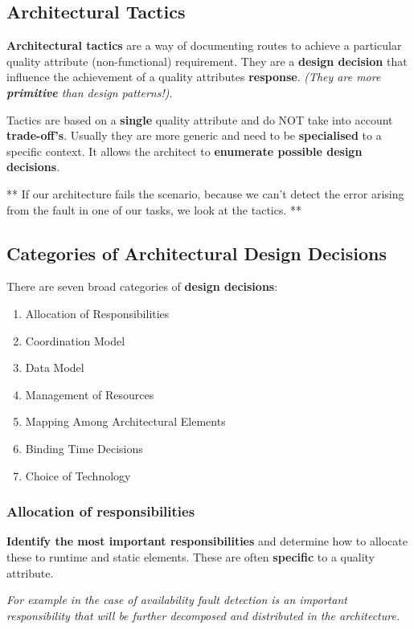 \documentclass[a4paper]{article}
\begin{document}
\subsection{Architectural Tactics}
\textbf{Architectural tactics} are a way of documenting routes to achieve a particular quality attribute (non-functional) requirement. They are a \textbf{design decision} that influence the achievement of a quality attributes \textbf{response}. \textit{(They are more \textbf{primitive} than design patterns!)}.

Tactics are based on a \textbf{single} quality attribute and do NOT take into account \textbf{trade-off's}. Usually they are more generic and need to be \textbf{specialised} to a specific context. It allows the architect to \textbf{enumerate possible design decisions}.

** If our architecture fails the scenario, because we can't detect the error arising from the fault in one of our tasks, we look at the tactics. **

\subsection{Categories of Architectural Design Decisions}
There are seven broad categories of \textbf{design decisions}:

\begin{enumerate}
\item Allocation of Responsibilities
\item Coordination Model
\item Data Model
\item Management of Resources
\item Mapping Among Architectural Elements
\item Binding Time Decisions
\item Choice of Technology
\end{enumerate}


\subsubsection{Allocation of responsibilities}
\textbf{Identify the most important responsibilities} and determine how to allocate these to runtime and static elements. These are often \textbf{specific} to a quality attribute. 

\textit{For example in the case of availability fault detection is an important responsibility that will be further decomposed and distributed in the architecture.}
\end{document}
